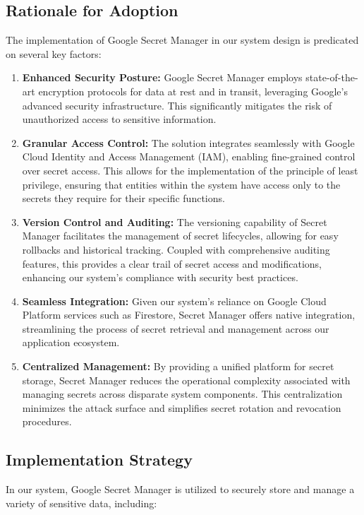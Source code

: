 \documentclass[a4paper, 12pt]{report}
\begin{document}
\subsection{Rationale for Adoption}
The implementation of Google Secret Manager in our system design is predicated on several key factors:

\begin{enumerate}
    \item \textbf{Enhanced Security Posture:} Google Secret Manager employs state-of-the-art encryption protocols for data at rest and in transit, leveraging Google's advanced security infrastructure. This significantly mitigates the risk of unauthorized access to sensitive information.
    \item \textbf{Granular Access Control:} The solution integrates seamlessly with Google Cloud Identity and Access Management (IAM), enabling fine-grained control over secret access. This allows for the implementation of the principle of least privilege, ensuring that entities within the system have access only to the secrets they require for their specific functions.

    \item \textbf{Version Control and Auditing:} The versioning capability of Secret Manager facilitates the management of secret lifecycles, allowing for easy rollbacks and historical tracking. Coupled with comprehensive auditing features, this provides a clear trail of secret access and modifications, enhancing our system's compliance with security best practices.

    \item \textbf{Seamless Integration:} Given our system's reliance on Google Cloud Platform services such as Firestore, Secret Manager offers native integration, streamlining the process of secret retrieval and management across our application ecosystem.

    \item \textbf{Centralized Management:} By providing a unified platform for secret storage, Secret Manager reduces the operational complexity associated with managing secrets across disparate system components. This centralization minimizes the attack surface and simplifies secret rotation and revocation procedures.
\end{enumerate}

\subsection{Implementation Strategy}
In our system, Google Secret Manager is utilized to securely store and manage a variety of sensitive data, including:
\end{document}

